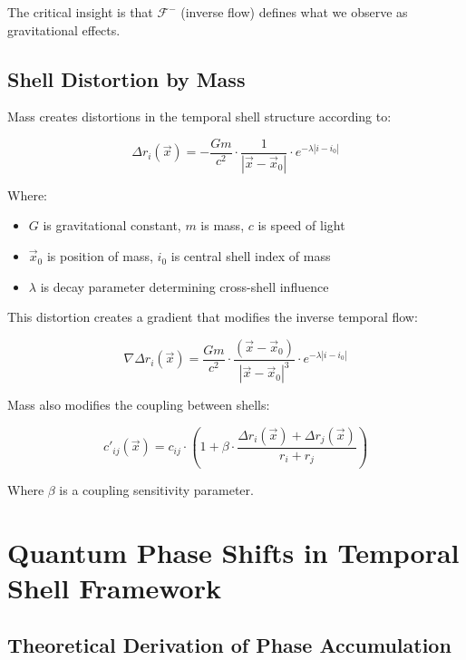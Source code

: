 \documentclass[12pt,a4paper]{article}
\begin{document}
The critical insight is that $\mathcal{F}^-$ (inverse flow) defines what we observe as gravitational effects.

\subsection{Shell Distortion by Mass}

Mass creates distortions in the temporal shell structure according to:

\begin{equation}
\Delta r_i(\vec{x}) = -\frac{G m}{c^2} \cdot \frac{1}{|\vec{x} - \vec{x}_0|} \cdot e^{-\lambda |i - i_0|}
\end{equation}

Where:
\begin{itemize}
    \item $G$ is gravitational constant, $m$ is mass, $c$ is speed of light \citep{einstein}
    \item $\vec{x}_0$ is position of mass, $i_0$ is central shell index of mass
    \item $\lambda$ is decay parameter determining cross-shell influence \citep{penrose}
\end{itemize}

This distortion creates a gradient that modifies the inverse temporal flow:

\begin{equation}
\nabla \Delta r_i(\vec{x}) = \frac{G m}{c^2} \cdot \frac{(\vec{x} - \vec{x}_0)}{|\vec{x} - \vec{x}_0|^3} \cdot e^{-\lambda |i - i_0|}
\end{equation}

Mass also modifies the coupling between shells:

\begin{equation}
c'_{ij}(\vec{x}) = c_{ij} \cdot \left(1 + \beta \cdot \frac{\Delta r_i(\vec{x}) + \Delta r_j(\vec{x})}{r_i + r_j}\right)
\end{equation}

Where $\beta$ is a coupling sensitivity parameter.

\section{Quantum Phase Shifts in Temporal Shell Framework}

\subsection{Theoretical Derivation of Phase Accumulation}
\end{document}
